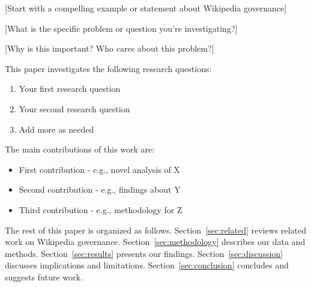 
[Start with a compelling example or statement about Wikipedia governance]

[What is the specific problem or question you're investigating?]

[Why is this important? Who cares about this problem?]

This paper investigates the following research questions:
\begin{enumerate}
    \item Your first research question
    \item Your second research question
    \item Add more as needed
\end{enumerate}

The main contributions of this work are:
\begin{itemize}
    \item First contribution - e.g., novel analysis of X
    \item Second contribution - e.g., findings about Y
    \item Third contribution - e.g., methodology for Z
\end{itemize}

The rest of this paper is organized as follows. 
Section~\ref{sec:related} reviews related work on Wikipedia governance. 
Section~\ref{sec:methodology} describes our data and methods.
Section~\ref{sec:results} presents our findings.
Section~\ref{sec:discussion} discusses implications and limitations.
Section~\ref{sec:conclusion} concludes and suggests future work.

